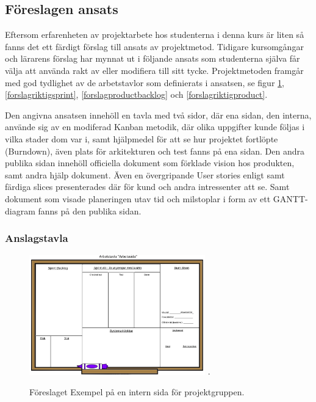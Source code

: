 \documentclass[conference,a4paper]{IEEEtran}
\begin{document}
\subsection{Föreslagen ansats}
Eftersom erfarenheten av projektarbete hos studenterna i denna kurs är liten så fanns det ett färdigt förslag till ansats av projektmetod. Tidigare kursomgångar och lärarens förslag har mynnat ut i följande ansats som studenterna själva får välja att använda rakt av eller modifiera till sitt tycke. Projektmetoden framgår med god tydlighet av de arbetstavlor som definierats i ansatsen, se figur \ref{forslagsprintbacklog}, \ref{forslagriktigsprint}, \ref{forslagproductbacklog} och \ref{forslagriktigproduct}.

Den angivna ansatsen innehöll en tavla med två sidor, där ena sidan, den interna, använde sig av en modiferad Kanban metodik, där olika uppgifter kunde följas i vilka stader dom var i, samt hjälpmedel för att se hur projektet fortlöpte (Burndown), även plats för arkitekturen och test fanns på ena sidan. Den andra publika sidan innehöll officiella dokument som förklade vision hos produkten, samt andra hjälp dokument. Även en övergripande User stories enligt \cite{Jacobson11} samt färdiga slices presenterades där för kund och andra intressenter att se. Samt dokument som visade planeringen utav tid och milstoplar i form av ett GANTT-diagram fanns på den publika sidan.

\subsubsection{Anslagstavla}

\begin{figure}[H]
\centering
\includegraphics[width=3in]{forslagsprintbacklog}
\DeclareGraphicsExtensions.
\caption{Föreslaget Exempel på en intern sida för projektgruppen.}
\label{forslagsprintbacklog}
\end{figure}
\end{document}
